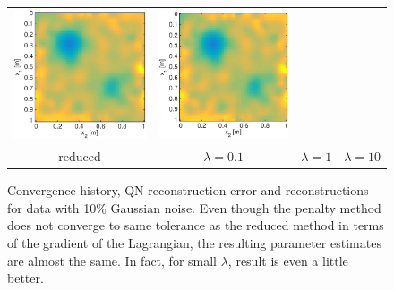 \documentclass{iopart}
\begin{document}
\begin{figure}
\begin{tabular}{cccc}
\includegraphics[scale=.2]{./figs/2D_exp3_h}&
\includegraphics[scale=.2]{./figs/2D_exp3_i}\\
{\small reduced}&{\small $\lambda=0.1$}&{\small $\lambda=1$}&{\small $\lambda=10$}\\
\end{tabular}
\caption{Convergence history, QN reconstruction error and reconstructions for data with 10\% Gaussian noise. Even though the penalty method does not converge to same tolerance as the reduced method in terms of the gradient of the Lagrangian, the resulting parameter estimates are almost the same. In fact, for small $\lambda$, result is even a little better.}
\label{fig:2D_exp3}
\end{figure}
\end{document}
